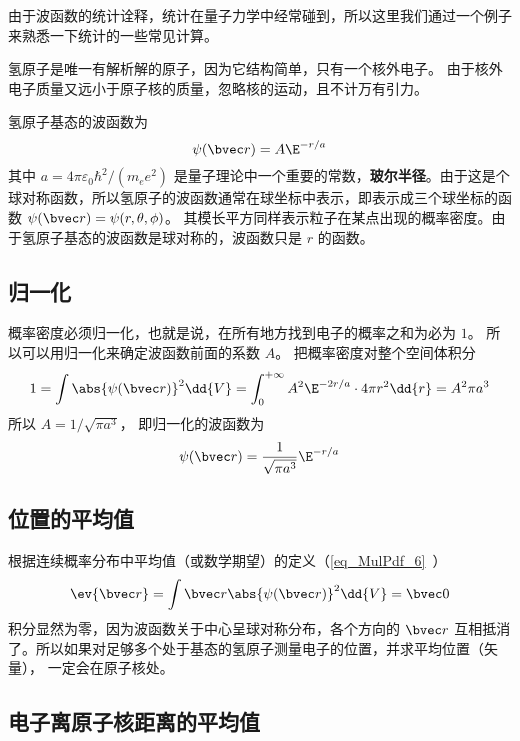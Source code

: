 

由于波函数的统计诠释，统计在量子力学中经常碰到，所以这里我们通过一个例子来熟悉一下统计的一些常见计算。

氢原子是唯一有解析解的原子，因为它结构简单，只有一个核外电子。 由于核外电子质量又远小于原子核的质量，忽略核的运动，且不计万有引力。

氢原子基态的波函数为
\begin{equation}
\psi(\bvec r) = A\E^{-r/a}
\end{equation}
其中 $a = 4\pi\varepsilon_0 \hbar ^2/(m_e e^2)$ 是量子理论中一个重要的常数，\textbf{玻尔半径}。由于这是个球对称函数，所以氢原子的波函数通常在球坐标中表示，即表示成三个球坐标的函数 $\psi (\bvec r) = \psi (r, \theta, \phi)$。 其模长平方同样表示粒子在某点出现的概率密度。由于氢原子基态的波函数是球对称的，波函数只是 $r$ 的函数。

\subsection{归一化}
  
概率密度必须归一化，也就是说，在所有地方找到电子的概率之和为必为 $1$。 所以可以用归一化来确定波函数前面的系数 $A$。 把概率密度对整个空间体积分
\begin{equation}
1 = \int \abs{\psi(\bvec r)} ^2 \dd{V}  = \int_0^{+\infty} A^2 \E^{-2r/a} \cdot 4\pi r^2\dd{r} = A^2 \pi a^3
\end{equation}
所以 $A = 1/\sqrt{\pi a^3}$， 即归一化的波函数为
\begin{equation}
\psi (\bvec r) = \frac{1}{\sqrt{\pi a^3}} \E^{-r/a}
\end{equation}

\subsection{位置的平均值}

 根据连续概率分布中平均值（或数学期望）的定义（\autoref{eq_MulPdf_6}~）
\begin{equation}
\ev{\bvec r} = \int \bvec r \abs{\psi (\bvec r)} ^2 \dd{V} =  \bvec 0
\end{equation}
积分显然为零，因为波函数关于中心呈球对称分布，各个方向的 $\bvec r$ 互相抵消了。所以如果对足够多个处于基态的氢原子测量电子的位置，并求平均位置（矢量）， 一定会在原子核处。

\subsection{电子离原子核距离的平均值}

